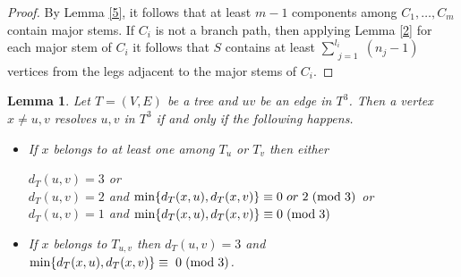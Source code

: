 \documentclass{article}
\newtheorem{lem}[thm]{Lemma}
\theoremstyle{definition}
\numberwithin{equation}{section}
\begin{document}
\begin{proof}
By Lemma \ref{5}, it follows that at least $m-1$ components among $C_{1},\hdots, C_{m}$ contain major stems. If $C_{i}$ is not a branch path, then applying Lemma \ref{2} for each major stem of $C_{i}$ it follows that
$S$ contains at least $\sum\limits_{\substack{{j=1}}}^{l_{i}} (n_{j}-1)$ vertices from the legs adjacent to the major stems of $C_{i}$.
\end{proof}


\begin{lem}\label{3}
Let $T=(V,E)$ be a tree and $uv$ be an edge in $T^{3}$. Then a vertex $x\neq u,v$ resolves $u,v$ in $T^{3}$ if and only if the following happens.

\begin{itemize}
\item If $x$ belongs to at least one among $T_{u}$ or $T_{v}$ then either 

\begin{center}
$d_{T}(u,v)=3$ or\\
\vspace{0.2em}
$d_{T}(u,v)=2$ and $\text{min}\{d_{T}(x,u),d_{T}(x,v)\}\equiv 0  \hspace{0.3 em}or \hspace{0.3 em} 2\hspace{0.3 em}(\text{mod} \hspace{0.3 em} 3)$ or \\
 
\vspace{0.2em}
$d_{T}(u,v)=1$ and $\text{min}\{d_{T}(x,u),d_{T}(x,v)\}\equiv 0\hspace{0.3 em} (\text{mod} \hspace{0.3 em} 3)$
\end{center} 
 

\item If $x$ belongs to $T_{u,v}$ then $d_{T}(u,v)=3$ and 
 $\text{min}\{d_{T}(x,u),d_{T}(x,v)\}\equiv \hspace{0.3 em} 0 \hspace{0.3 em}(\text{mod}  \hspace{0.3 em}3)$. 
 \end{itemize}
\end{lem}

\end{document}
